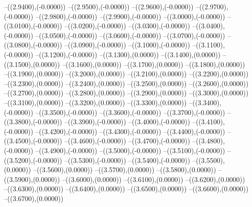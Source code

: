 {	--({\sx*(2.9400)},{\sy*(-0.0000)})
	--({\sx*(2.9500)},{\sy*(-0.0000)})
	--({\sx*(2.9600)},{\sy*(-0.0000)})
	--({\sx*(2.9700)},{\sy*(-0.0000)})
	--({\sx*(2.9800)},{\sy*(-0.0000)})
	--({\sx*(2.9900)},{\sy*(-0.0000)})
	--({\sx*(3.0000)},{\sy*(-0.0000)})
	--({\sx*(3.0100)},{\sy*(-0.0000)})
	--({\sx*(3.0200)},{\sy*(-0.0000)})
	--({\sx*(3.0300)},{\sy*(-0.0000)})
	--({\sx*(3.0400)},{\sy*(-0.0000)})
	--({\sx*(3.0500)},{\sy*(-0.0000)})
	--({\sx*(3.0600)},{\sy*(-0.0000)})
	--({\sx*(3.0700)},{\sy*(-0.0000)})
	--({\sx*(3.0800)},{\sy*(-0.0000)})
	--({\sx*(3.0900)},{\sy*(-0.0000)})
	--({\sx*(3.1000)},{\sy*(-0.0000)})
	--({\sx*(3.1100)},{\sy*(-0.0000)})
	--({\sx*(3.1200)},{\sy*(-0.0000)})
	--({\sx*(3.1300)},{\sy*(0.0000)})
	--({\sx*(3.1400)},{\sy*(0.0000)})
	--({\sx*(3.1500)},{\sy*(0.0000)})
	--({\sx*(3.1600)},{\sy*(0.0000)})
	--({\sx*(3.1700)},{\sy*(0.0000)})
	--({\sx*(3.1800)},{\sy*(0.0000)})
	--({\sx*(3.1900)},{\sy*(0.0000)})
	--({\sx*(3.2000)},{\sy*(0.0000)})
	--({\sx*(3.2100)},{\sy*(0.0000)})
	--({\sx*(3.2200)},{\sy*(0.0000)})
	--({\sx*(3.2300)},{\sy*(0.0000)})
	--({\sx*(3.2400)},{\sy*(0.0000)})
	--({\sx*(3.2500)},{\sy*(0.0000)})
	--({\sx*(3.2600)},{\sy*(0.0000)})
	--({\sx*(3.2700)},{\sy*(0.0000)})
	--({\sx*(3.2800)},{\sy*(0.0000)})
	--({\sx*(3.2900)},{\sy*(0.0000)})
	--({\sx*(3.3000)},{\sy*(0.0000)})
	--({\sx*(3.3100)},{\sy*(0.0000)})
	--({\sx*(3.3200)},{\sy*(0.0000)})
	--({\sx*(3.3300)},{\sy*(0.0000)})
	--({\sx*(3.3400)},{\sy*(-0.0000)})
	--({\sx*(3.3500)},{\sy*(-0.0000)})
	--({\sx*(3.3600)},{\sy*(-0.0000)})
	--({\sx*(3.3700)},{\sy*(-0.0000)})
	--({\sx*(3.3800)},{\sy*(-0.0000)})
	--({\sx*(3.3900)},{\sy*(-0.0000)})
	--({\sx*(3.4000)},{\sy*(-0.0000)})
	--({\sx*(3.4100)},{\sy*(-0.0000)})
	--({\sx*(3.4200)},{\sy*(-0.0000)})
	--({\sx*(3.4300)},{\sy*(-0.0000)})
	--({\sx*(3.4400)},{\sy*(-0.0000)})
	--({\sx*(3.4500)},{\sy*(-0.0000)})
	--({\sx*(3.4600)},{\sy*(-0.0000)})
	--({\sx*(3.4700)},{\sy*(-0.0000)})
	--({\sx*(3.4800)},{\sy*(-0.0000)})
	--({\sx*(3.4900)},{\sy*(-0.0000)})
	--({\sx*(3.5000)},{\sy*(-0.0000)})
	--({\sx*(3.5100)},{\sy*(-0.0000)})
	--({\sx*(3.5200)},{\sy*(-0.0000)})
	--({\sx*(3.5300)},{\sy*(-0.0000)})
	--({\sx*(3.5400)},{\sy*(-0.0000)})
	--({\sx*(3.5500)},{\sy*(0.0000)})
	--({\sx*(3.5600)},{\sy*(0.0000)})
	--({\sx*(3.5700)},{\sy*(0.0000)})
	--({\sx*(3.5800)},{\sy*(0.0000)})
	--({\sx*(3.5900)},{\sy*(0.0000)})
	--({\sx*(3.6000)},{\sy*(0.0000)})
	--({\sx*(3.6100)},{\sy*(0.0000)})
	--({\sx*(3.6200)},{\sy*(0.0000)})
	--({\sx*(3.6300)},{\sy*(0.0000)})
	--({\sx*(3.6400)},{\sy*(0.0000)})
	--({\sx*(3.6500)},{\sy*(0.0000)})
	--({\sx*(3.6600)},{\sy*(0.0000)})
	--({\sx*(3.6700)},{\sy*(0.0000)})
}

